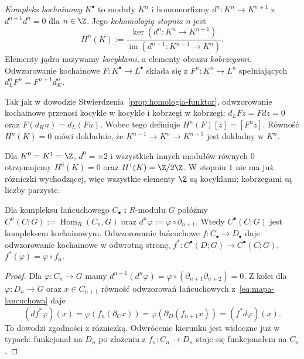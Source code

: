 \begin{definicja}
\label{def:kohomologia-algebraiczna}
\emph{Kompleks kochainowy} $K^\bullet$ to
moduły $K^n$ i homomorfizmy
$d^n:K^n\to K^{n+1}$ z
$d^{n+1}d^n=0$ dla $n\in\Z$. Jego \emph{kohomologią stopnia $n$}
jest
\begin{equation}\label{eq:kohomologia-def}
 H^n(K):=\frac{\ker(d^n:K^n\to K^{n+1})}
 {\operatorname{im}(d^{n-1}:K^{n-1}\to K^n)}.
\end{equation}
Elementy jądra nazywamy \emph{kocyklami},
a elementy obrazu \emph{kobrzegami}.
Odwzorowanie kochainowe $F:K^\bullet\to L^\bullet$
składa się z $F^n:K^n\to L^n$ spełniających
$d_L^nF^n=F^{n+1}d_K^n$.
\end{definicja}

Tak jak w dowodzie
Stwierdzenia~\ref{prop:homologia-funktor},
odwzorowanie kochainowe przenosi kocykle w
kocykle i kobrzegi w kobrzegi:
$d_LFz=Fdz=0$ oraz
$F(d_Ku)=d_L(Fu)$. Wobec tego definiuje
$H^n(F)[z]=[F^nz]$. Równość
$H^n(K)=0$ mówi dokładnie, że
$K^{n-1}\to K^n\to K^{n+1}$
jest dokładny w $K^n$.

\begin{przyklad}
Dla $K^0=K^1=\Z$, $d^0=\times2$
i wszystkich innych modułów równych $0$
otrzymujemy $H^0(K)=0$ oraz
$H^1(K)=\Z/2\Z$. W stopniu $1$ nie ma
już różniczki wychodzącej, więc
wszystkie elementy $\Z$ są kocyklami;
kobrzegami są liczby parzyste.
\end{przyklad}

\begin{stwierdzenie}
\label{prop:kompleks-dualny}
Dla kompleksu łańcuchowego $C_\bullet$
i $R$-modułu $G$ połóżmy
$C^n(C;G):=\operatorname{Hom}_R(C_n,G)$ oraz
$d^n\varphi:=\varphi\circ\partial_{n+1}$.
Wtedy $C^\bullet(C;G)$ jest kompleksem
kochainowym. Odwzorowanie łańcuchowe
$f:C_\bullet\to D_\bullet$ daje odwzorowanie
kochainowe w odwrotną stronę,
$f^*:C^\bullet(D;G)\to C^\bullet(C;G)$,
$f^*(\varphi)=\varphi\circ f_n$.
\end{stwierdzenie}
\begin{proof}
Dla $\varphi:C_n\to G$ mamy
$d^{n+1}(d^n\varphi)
=\varphi\circ(\partial_{n+1}\partial_{n+2})=0$.
Z kolei dla $\varphi:D_n\to G$
oraz $x\in C_{n+1}$ równość odwzorowań łańcuchowych
z~\eqref{eq:mapa-lancuchowa} daje
\[
 (d f^*\varphi)(x)
 =\varphi(f_n(\partial_C x))
 =\varphi(\partial_D(f_{n+1}x))
 =(f^*d\varphi)(x).
\]
To dowodzi zgodności z różniczką.
Odwrócenie kierunku jest widoczne już w typach:
funkcjonał na $D_n$ po złożeniu z $f_n:C_n\to D_n$
staje się funkcjonałem na $C_n$.
\end{proof}

